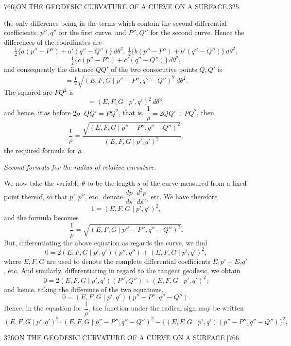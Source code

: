 \documentclass[11pt]{article}
\begin{document}
\begin{center}
{\small 766]\hfill ON THE GEODESIC CURVATURE OF A CURVE ON A SURFACE.\hfill 325}
\end{center}

the only difference being in the terms which contain the second differential coefficients,
$p'', q''$ for the first curve, and $P'', Q''$ for the second curve. Hence the differences
of the coordinates are
\[
\tfrac{1}{2}\{a(p'' - P'') + a'(q'' - Q'')\}\,d\theta^2,\ \tfrac{1}{2}\{b(p'' - P'') + b'(q'' - Q'')\}\,d\theta^2,
\]
\[
\tfrac{1}{2}\{c(p'' - P'') + c'(q'' - Q'')\}\,d\theta^2,
\]
and consequently the distance $QQ'$ of the two consecutive points $Q, Q'$ is
\[
= \tfrac{1}{2}\sqrt{(E, F, G \mid p'' - P'', q'' - Q'')^2}\,d\theta^2.
\]
The squared arc $PQ^2$ is
\[
= (E, F, G \mid p', q')^2\,d\theta^2;
\]
and hence, if as before $2\rho\cdot QQ' = PQ^2$, that is, $\dfrac{1}{\rho} = 2QQ' \div PQ^2$, then
\[
\frac{1}{\rho} = \frac{\sqrt{(E, F, G \mid p'' - P'', q'' - Q'')^2}}{(E, F, G \mid p', q')^2},
\]
the required formula for $\rho$.

\begin{center}\textit{Second formula for the radius of relative curvature.}\end{center}

We now take the variable $\theta$ to be the length $s$ of the curve measured from a
fixed point thereof, so that $p', p''$, etc.\ denote $\dfrac{dp}{ds}, \dfrac{d^2p}{ds^2}$, etc. We have therefore
\[
1 = (E, F, G \mid p', q')^2,
\]
and the formula becomes
\[
\frac{1}{\rho} = \sqrt{(E, F, G \mid p'' - P'', q'' - Q'')^2}.
\]
But, differentiating the above equation as regards the curve, we find
\[
0 = 2(E, F, G \mid p', q')(p'', q'') + (E, F, G \mid p', q')^2,
\]
where $E, F, G$ are used to denote the complete differential coefficients $E_1 p' + E_2 q'$, etc.
And similarly, differentiating in regard to the tangent geodesic, we obtain
\[
0 = 2(E, F, G \mid p', q')(P'', Q'') + (E, F, G \mid p', q')^2;
\]
and hence, taking the difference of the two equations,
\[
0 = (E, F, G \mid p', q')(p'' - P'', q'' - Q'').
\]
Hence, in the equation for $\dfrac{1}{\rho}$, the function under the radical sign may be written
\[
(E, F, G \mid p', q')^2\cdot(E, F, G \mid p'' - P'', q'' - Q'')^2 - \{(E, F, G \mid p', q')(p'' - P'', q'' - Q'')\}^2,
\]

\begin{center}
{\small 326\hfill ON THE GEODESIC CURVATURE OF A CURVE ON A SURFACE.\hfill [766}
\end{center}
\end{document}
